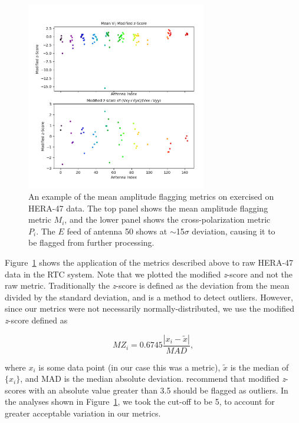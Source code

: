 \begin{figure}
\centering
\includegraphics[width=0.7\textwidth]{chapters/data_processing/figures/metrics.png}
\caption[An example of the mean amplitude flagging metrics on exercised on HERA-47 data.]{An example of the mean amplitude flagging metrics on exercised on HERA-47 data. The top panel shows the mean amplitude flagging metric $M_i$, and the lower panel shows the cross-polarization metric $P_i$. The $E$ feed of antenna 50 shows at $\sim$15$\sigma$ deviation, causing it to be flagged from further processing.}
\label{fig:data_metrics}
\end{figure}

Figure~\ref{fig:data_metrics} shows the application of the metrics described above to raw HERA-47 data in the RTC system. Note that we plotted the modified \textit{z}-score and not
the raw metric. Traditionally the \textit{z}-score is defined as the deviation from the
mean divided by the standard deviation, and is a method to detect outliers.
However, since our metrics were not necessarily normally-distributed, we use the
modified \textit{z}-score defined as 

\begin{equation}\label{eqn:modifiedzscore}
    MZ_{i} = 0.6745\frac{|x_{i} - \tilde{x}|} {MAD},
\end{equation}

where $x_{i}$ is some data point (in our case this was a metric),
$\tilde{x}$ is the median of ${\{x_{i}\}}$, and MAD is the median absolute
deviation. \cite{Iglewicz.10} recommend that modified
\textit{z}-scores with an absolute value greater than 3.5 should be flagged as outliers.
In the analyses shown in Figure~\ref{fig:data_metrics}, we took the cut-off to be 5, to account for greater acceptable
variation in our metrics.

